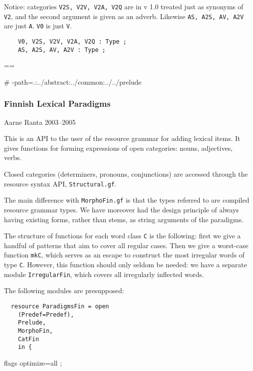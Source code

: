 \documentclass[11pt,a4paper]{article}
\newcommand{\commOut}[1]{}
\begin{document}
Notice: categories \texttt{V2S, V2V, V2A, V2Q} are in v 1.0 treated
just as synonyms of \texttt{V2}, and the second argument is given
as an adverb. Likewise \texttt{AS, A2S, AV, A2V} are just \texttt{A}.
\texttt{V0} is just \texttt{V}.

\begin{verbatim}
    V0, V2S, V2V, V2A, V2Q : Type ;
    AS, A2S, AV, A2V : Type ;
\end{verbatim}


\commOut{Produced by 
gfdoc - a rudimentary GF document generator.
(c) Aarne Ranta (\htmladdnormallink{aarne@cs.chalmers.se}{mailto:aarne@cs.chalmers.se}) 2002 under GNU GPL.}

==

\# -path=.:../abstract:../common:../../prelude


\subsubsection{Finnish Lexical Paradigms}
Aarne Ranta 2003--2005

This is an API to the user of the resource grammar 
for adding lexical items. It gives functions for forming
expressions of open categories: nouns, adjectives, verbs.

Closed categories (determiners, pronouns, conjunctions) are
accessed through the resource syntax API, \texttt{Structural.gf}. 

The main difference with \texttt{MorphoFin.gf} is that the types
referred to are compiled resource grammar types. We have moreover
had the design principle of always having existing forms, rather
than stems, as string arguments of the paradigms.

The structure of functions for each word class \texttt{C} is the following:
first we give a handful of patterns that aim to cover all
regular cases. Then we give a worst-case function \texttt{mkC}, which serves as an
escape to construct the most irregular words of type \texttt{C}.
However, this function should only seldom be needed: we have a
separate module \texttt{IrregularFin}, which covers all irregularly inflected
words.

The following modules are presupposed:

\begin{verbatim}
  resource ParadigmsFin = open 
    (Predef=Predef), 
    Prelude, 
    MorphoFin,
    CatFin
    in {
\end{verbatim}

flags optimize=all ;
\end{document}
